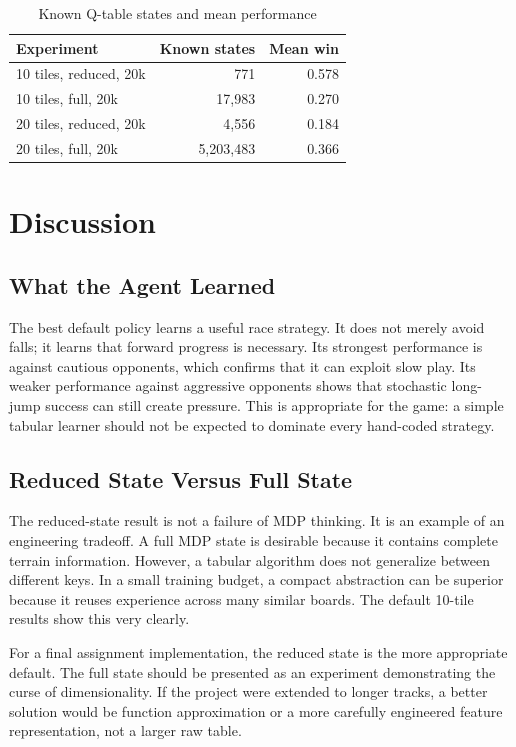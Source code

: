 \documentclass[conference]{IEEEtran}
\begin{document}
\begin{table}[h]
\centering
\caption{Known Q-table states and mean performance}
\label{tab:states}
\begin{tabular}{lrr}
\toprule
Experiment & Known states & Mean win \\
\midrule
10 tiles, reduced, 20k & 771 & 0.578 \\
10 tiles, full, 20k & 17,983 & 0.270 \\
20 tiles, reduced, 20k & 4,556 & 0.184 \\
20 tiles, full, 20k & 5,203,483 & 0.366 \\
\bottomrule
\end{tabular}
\end{table}

\section{Discussion}

\subsection{What the Agent Learned}

The best default policy learns a useful race strategy. It does not merely avoid
falls; it learns that forward progress is necessary. Its strongest performance is
against cautious opponents, which confirms that it can exploit slow play. Its
weaker performance against aggressive opponents shows that stochastic long-jump
success can still create pressure. This is appropriate for the game: a simple
tabular learner should not be expected to dominate every hand-coded strategy.

\subsection{Reduced State Versus Full State}

The reduced-state result is not a failure of MDP thinking. It is an example of an
engineering tradeoff. A full MDP state is desirable because it contains complete
terrain information. However, a tabular algorithm does not generalize between
different keys. In a small training budget, a compact abstraction can be superior
because it reuses experience across many similar boards. The default 10-tile
results show this very clearly.

For a final assignment implementation, the reduced state is the more appropriate
default. The full state should be presented as an experiment demonstrating the
curse of dimensionality. If the project were extended to longer tracks, a better
solution would be function approximation or a more carefully engineered feature
representation, not a larger raw table.
\end{document}
